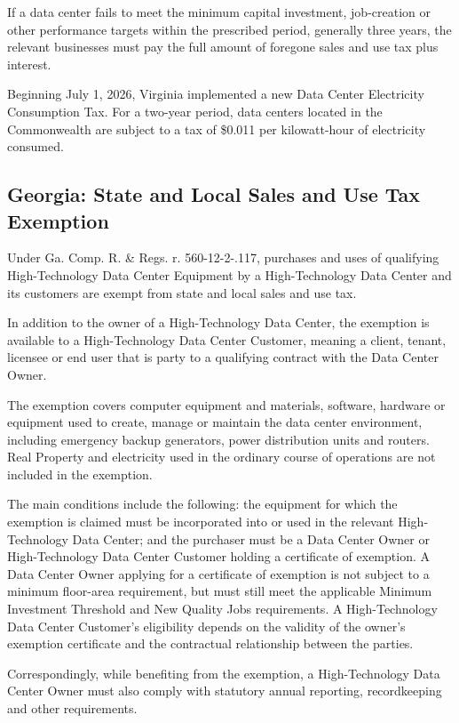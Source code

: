 If a data center fails to meet the minimum capital investment, job-creation or other performance targets within the prescribed period, generally three years, the relevant businesses must pay the full amount of foregone sales and use tax plus interest.

Beginning July 1, 2026, Virginia implemented a new Data Center Electricity Consumption Tax. For a two-year period, data centers located in the Commonwealth are subject to a tax of \$0.011 per kilowatt-hour of electricity consumed.

\subsection{Georgia: State and Local Sales and Use Tax Exemption}

Under Ga. Comp. R. \& Regs. r. 560-12-2-.117, purchases and uses of qualifying High-Technology Data Center Equipment by a High-Technology Data Center and its customers are exempt from state and local sales and use tax.

In addition to the owner of a High-Technology Data Center, the exemption is available to a High-Technology Data Center Customer, meaning a client, tenant, licensee or end user that is party to a qualifying contract with the Data Center Owner.

The exemption covers computer equipment and materials, software, hardware or equipment used to create, manage or maintain the data center environment, including emergency backup generators, power distribution units and routers. Real Property and electricity used in the ordinary course of operations are not included in the exemption.

The main conditions include the following: the equipment for which the exemption is claimed must be incorporated into or used in the relevant High-Technology Data Center; and the purchaser must be a Data Center Owner or High-Technology Data Center Customer holding a certificate of exemption. A Data Center Owner applying for a certificate of exemption is not subject to a minimum floor-area requirement, but must still meet the applicable Minimum Investment Threshold and New Quality Jobs requirements. A High-Technology Data Center Customer's eligibility depends on the validity of the owner's exemption certificate and the contractual relationship between the parties.



Correspondingly, while benefiting from the exemption, a High-Technology Data Center Owner must also comply with statutory annual reporting, recordkeeping and other requirements.

